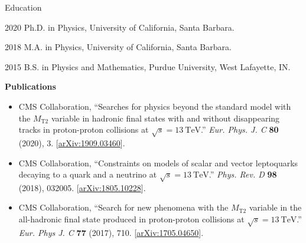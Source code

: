 \begin{vitae}

\begin{vitaesection}{Education}
\vspace{-0.1cm}
\item [2020] Ph.D. in Physics, University of California, Santa Barbara.
\item [2018] M.A. in Physics, University of California, Santa Barbara.
\item [2015] B.S. in Physics and Mathematics, Purdue University, West Lafayette, IN.
\end{vitaesection}

\vspace{0.5cm}
\textbf{Publications}


\begin{itemize}

\item CMS Collaboration, ``Searches for physics beyond the standard model with the $M_\mathrm{T2}$ variable in hadronic
  final states with and without disappearing tracks in proton-proton collisions at $\sqrt{s}=13~\mathrm{TeV}$.''
  \textit{Eur. Phys. J. C} \textbf{80} (2020), 3.
  [\href{https://arxiv.org/abs/1909.03460}{arXiv:1909.03460}].

\item CMS Collaboration, ``Constraints on models of scalar and vector leptoquarks decaying to a quark
  and a neutrino at $\sqrt{s}=13~\mathrm{TeV}$.'' \textit{Phys. Rev. D}
  \textbf{98} (2018), 032005. 
  [\href{https://arxiv.org/abs/1805.10228}{arXiv:1805.10228}].

\item CMS Collaboration, ``Search for new phenomena with the $M_\mathrm{T2}$ variable in the all-hadronic
  final state produced in proton-proton collisions at $\sqrt{s}=13~\mathrm{TeV}$.'' \textit{Eur. Phys J. C}
  \textbf{77} (2017), 710.
  [\href{https://arxiv.org/abs/1705.04650}{arXiv:1705.04650}].


\end{itemize}
\end{vitae}

